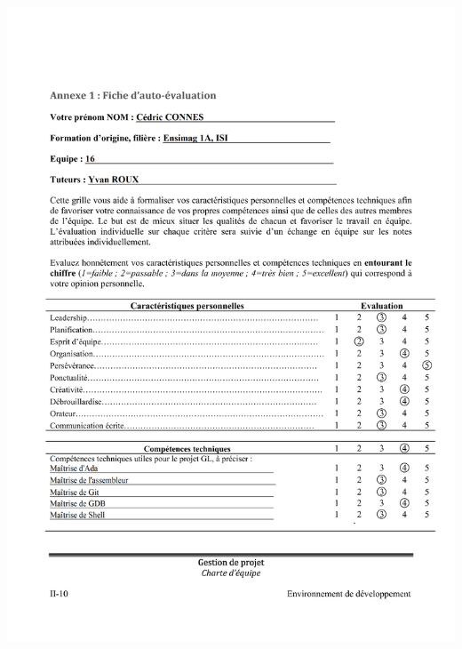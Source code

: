 \documentclass[11pt]{article}
\begin{document}
\includegraphics[scale=0.9]{auto-eval_Cedric.png}
\newpage
\end{document}
